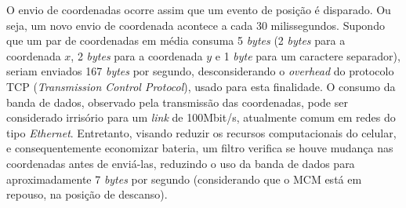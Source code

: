 O envio de coordenadas ocorre assim que um evento de posição é disparado. Ou seja, um novo envio de coordenada acontece a cada 30 milissegundos. Supondo que um par de coordenadas em média consuma 5 \textit{bytes} (2 \textit{bytes} para a coordenada $x$, 2 \textit{bytes} para a coordenada $y$ e 1 \textit{byte} para um caractere separador), seriam enviados 167 \textit{bytes} por segundo, desconsiderando o \textit{overhead} do protocolo TCP (\textit{Transmission Control Protocol}), usado para esta finalidade. O consumo da banda de dados, observado pela transmissão das coordenadas, pode ser considerado irrisório para um \textit{link} de 100Mbit/s, atualmente comum em redes do tipo \textit{Ethernet}. Entretanto, visando reduzir os recursos computacionais do celular, e consequentemente economizar bateria, um filtro verifica se houve mudança nas coordenadas antes de enviá-las, reduzindo o uso da banda de dados para aproximadamente 7 \textit{bytes} por segundo (considerando que o MCM está em repouso, na posição de descanso).\par

  